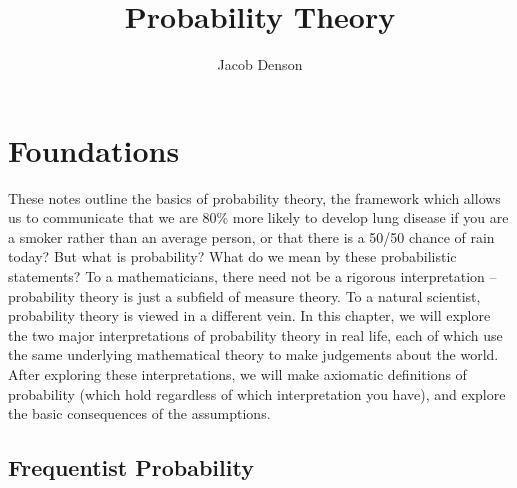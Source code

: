 

\DeclareMathOperator{\Prob}{\mathbf{P}}
\DeclareMathOperator{\Ber}{\text{Ber}}
\DeclareMathOperator{\Bin}{\text{Bin}}
\DeclareMathOperator{\Geo}{\text{Geo}}
\DeclareMathOperator{\Poisson}{\text{Poisson}}
\DeclareMathOperator{\Uni}{\text{Uni}}
\DeclareMathOperator{\Multi}{\text{Multi}}
\DeclareMathOperator{\Expect}{\mathbf{E}}
\DeclareMathOperator{\Exp}{\text{Exp}}
\DeclareMathOperator{\Beta}{\text{Beta}}

\title{Probability Theory}
\author{Jacob Denson}



\maketitle
\tableofcontents
{}

\chapter{Foundations}

These notes outline the basics of probability theory, the framework which allows us to communicate that we are 80\% more likely to develop lung disease if you are a smoker rather than an average person, or that there is a 50/50 chance of rain today? But what is probability? What do we mean by these probabilistic statements? To a mathematicians, there need not be a rigorous interpretation -- probability theory is just a subfield of measure theory. To a natural scientist, probability theory is viewed in a different vein. In this chapter, we will explore the two major interpretations of probability theory in real life, each of which use the same underlying mathematical theory to make judgements about the world. After exploring these interpretations, we will make axiomatic definitions of probability (which hold regardless of which interpretation you have), and explore the basic consequences of the assumptions.

\section{Frequentist Probability}

